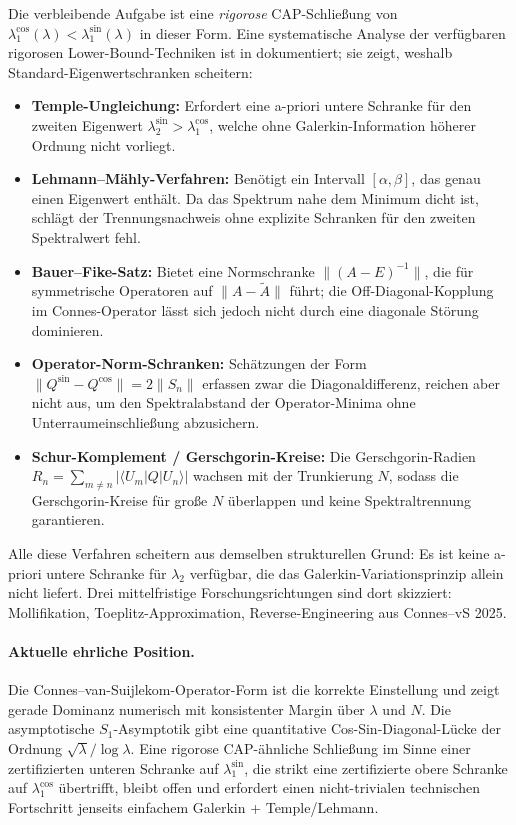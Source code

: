 \documentclass[11pt,a4paper]{article}
\theoremstyle{remark}
\theoremstyle{plain}
\begin{document}
Die verbleibende Aufgabe ist eine \emph{rigorose} CAP-Schließung von $\lambda_1^{\cos}(\lambda) < \lambda_1^{\sin}(\lambda)$ in dieser Form. Eine systematische Analyse der verfügbaren rigorosen Lower-Bound-Techniken ist in  dokumentiert; sie zeigt, weshalb Standard-Eigenwertschranken scheitern:
\begin{itemize}[leftmargin=*]
  \item \textbf{Temple-Ungleichung:} Erfordert eine a-priori untere Schranke für den zweiten Eigenwert $\lambda_2^{\sin} > \lambda_1^{\cos}$, welche ohne Galerkin-Information höherer Ordnung nicht vorliegt.
  \item \textbf{Lehmann--Mähly-Verfahren:} Benötigt ein Intervall $[\alpha, \beta]$, das genau einen Eigenwert enthält. Da das Spektrum nahe dem Minimum dicht ist, schlägt der Trennungsnachweis ohne explizite Schranken für den zweiten Spektralwert fehl.
  \item \textbf{Bauer--Fike-Satz:} Bietet eine Normschranke $\|(A - E)^{-1}\|$, die für symmetrische Operatoren auf $\|A - \tilde A\|$ führt; die Off-Diagonal-Kopplung im Connes-Operator lässt sich jedoch nicht durch eine diagonale Störung dominieren.
  \item \textbf{Operator-Norm-Schranken:} Schätzungen der Form $\|Q^{\sin} - Q^{\cos}\| = 2\|S_n\|$ erfassen zwar die Diagonaldifferenz, reichen aber nicht aus, um den Spektralabstand der Operator-Minima ohne Unterraumeinschließung abzusichern.
  \item \textbf{Schur-Komplement / Gerschgorin-Kreise:} Die Gerschgorin-Radien $R_n = \sum_{m\neq n} |\langle U_m | Q | U_n \rangle|$ wachsen mit der Trunkierung $N$, sodass die Gerschgorin-Kreise für große $N$ überlappen und keine Spektraltrennung garantieren.
\end{itemize}
Alle diese Verfahren scheitern aus demselben strukturellen Grund: Es ist keine a-priori untere Schranke für $\lambda_2$ verfügbar, die das Galerkin-Variationsprinzip allein nicht liefert. Drei mittelfristige Forschungsrichtungen sind dort skizziert: Mollifikation, Toeplitz-Approximation, Reverse-Engineering aus Connes--vS 2025.

\paragraph{Aktuelle ehrliche Position.}  Die Connes--van-Suijlekom-Operator-Form ist die korrekte Einstellung und zeigt gerade Dominanz numerisch mit konsistenter Margin über $\lambda$ und $N$. Die asymptotische $S_1$-Asymptotik gibt eine quantitative Cos-Sin-Diagonal-Lücke der Ordnung $\sqrt\lambda/\log\lambda$. Eine rigorose CAP-ähnliche Schließung im Sinne einer zertifizierten unteren Schranke auf $\lambda_1^{\sin}$, die strikt eine zertifizierte obere Schranke auf $\lambda_1^{\cos}$ übertrifft, bleibt offen und erfordert einen nicht-trivialen technischen Fortschritt jenseits einfachem Galerkin + Temple/Lehmann.
\end{document}
